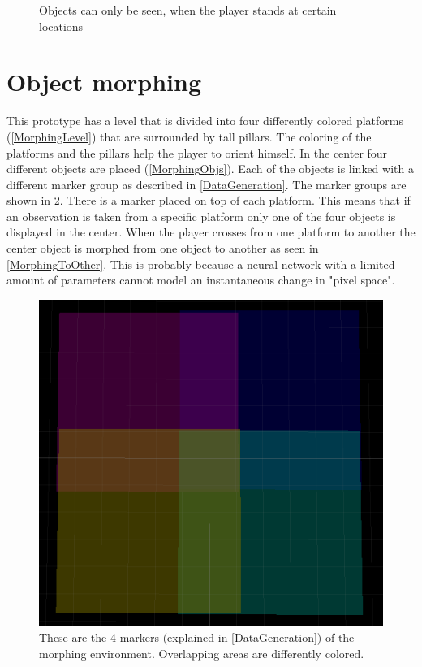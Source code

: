 \begin{figure}[p]
  \caption{Objects can only be seen, when the player stands at certain locations}
  \label{WalkingSim}
\end{figure}


\section{Object morphing}
This prototype has a level that is divided into four differently colored platforms (\cref{MorphingLevel}) that are surrounded by tall pillars. The coloring of the platforms and the pillars help the player to orient himself. In the center four different objects are placed (\cref{MorphingObjs}). Each of the objects is linked with a different marker group as described in \cref{DataGeneration}. The marker groups are shown in \cref{MorphingMarkers}. There is a marker placed on top of each platform. This means that if an observation is taken from a specific platform only one of the four objects is displayed in the center. When the player crosses from one platform to another the center object is morphed from one object to another as seen in \cref{MorphingToOther}. This is probably because a neural network with a limited amount of parameters cannot model an instantaneous change in "pixel space".

\begin{figure}[p]
  \centering
  \includegraphics[width=\imgWidth]{images/workflow/object_morphing/CaptureAreas.png}
  \caption{These are the 4 markers (explained in \cref{DataGeneration}) of the morphing environment. Overlapping areas are differently colored.}
  \label{MorphingMarkers}
\end{figure}

